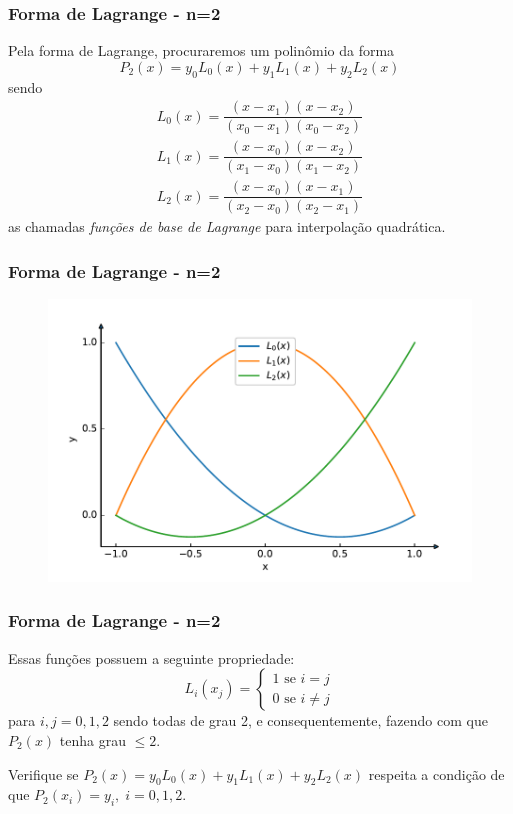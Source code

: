 \documentclass{beamer}
\theoremstyle{mystyle}
\begin{document}
\begin{frame}
	\frametitle{Forma de Lagrange - n=2}
	Pela forma de Lagrange, procuraremos um polinômio da forma
	\begin{equation*}
		P_{2}(x) = y_{0}L_{0}(x) + y_{1}L_{1}(x) + y_{2}L_{2}(x)
	\end{equation*}
	sendo
	\begin{gather*}
		L_{0}(x) =  \dfrac{(x - x_{1})(x - x_{2})}{(x_{0} - x_{1})(x_{0} - x_{2})}\\
		L_{1}(x) =  \dfrac{(x - x_{0})(x - x_{2})}{(x_{1} - x_{0})(x_{1} - x_{2})}\\
		L_{2}(x) =  \dfrac{(x - x_{0})(x - x_{1})}{(x_{2} - x_{0})(x_{2} - x_{1})}				
	\end{gather*}
	as chamadas \textit{funções de base de Lagrange} para interpolação quadrática.
\end{frame}

\begin{frame}
	\frametitle{Forma de Lagrange - n=2}
	\begin{figure}
		\centering
		\includegraphics[width=0.9\linewidth]{Figuras/grafico_04}
		\label{fig:grafico04}
	\end{figure}
\end{frame}

\begin{frame}
	\frametitle{Forma de Lagrange - n=2}
	Essas funções possuem a seguinte propriedade:
	\begin{equation*}
		L_{i}(x_{j}) = \left\lbrace
		\begin{array}{c}
			1 \mbox{ se } i = j \\
			0 \mbox{ se } i\neq j
		\end{array}
		 \right. 
	\end{equation*}
	para $ i, j = 0, 1, 2 $ sendo todas de grau 2, e consequentemente, fazendo com que $ P_{2}(x) $ tenha grau $ \leq 2 $.
	\pause
	
	Verifique se $ P_{2}(x) = y_{0}L_{0}(x) + y_{1}L_{1}(x) + y_{2}L_{2}(x)  $ respeita a condição de que $ P_{2}(x_{i}) = y_{i}, \; i=0,1,2 $.
\end{frame}
\end{document}
